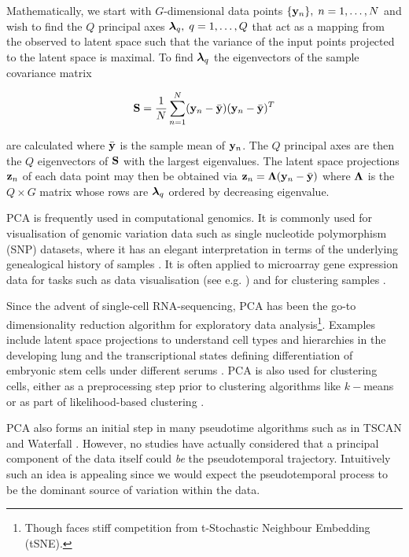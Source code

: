 Mathematically, we start with $G$-dimensional data points $\{\mathbf{y}_n\}, \; n = 1, \ldots, N$ and wish to find the $Q$ principal axes $\bm{\lambda}_q, \; q = 1, \ldots, Q$ that act as a mapping from the observed to latent space such that the variance of the input points projected to the latent space is maximal. To find $\bm{\lambda}_q$ the eigenvectors of the sample covariance matrix

\begin{equation}
  \mathbf{S} = \frac{1}{N}\sum_{n = 1}^N (\mathbf{y}_n - \bar{\mathbf{y}}) (\mathbf{y}_n - \bar{\mathbf{y}})^T
\end{equation}

are calculated where $\bar{\mathbf{y}}$ is the sample mean of $\mathbf{y}_n$. The $Q$ principal axes are then the $Q$ eigenvectors of $\mathbf{S}$ with the largest eigenvalues. The latent space projections $\mathbf{z}_n$ of each data point may then be obtained via $\mathbf{z}_n = \bm{\Lambda} (\mathbf{y}_n - \bar{\mathbf{y}})$ where $\bm{\Lambda}$ is the $Q \times G$ matrix whose rows are $\bm{\lambda}_q$ ordered by decreasing eigenvalue.

PCA is frequently used in computational genomics. It is commonly used for visualisation of genomic variation data such as single nucleotide polymorphism (SNP) datasets, where it has an elegant interpretation in terms of the underlying genealogical history of samples \cite{mcvean2009genealogical}.
It is often applied to microarray gene expression data for tasks such as data visualisation (see e.g. \cite{ringner2008principal}) and for clustering samples \cite{yeung2001principal}.

Since the advent of single-cell RNA-sequencing, PCA has been the go-to dimensionality reduction algorithm for exploratory data analysis\footnote{Though faces stiff competition from t-Stochastic Neighbour Embedding (tSNE).}. Examples include latent space projections to understand cell types and hierarchies in the developing lung \cite{Treutlein2014-ob} and the transcriptional states defining differentiation of embryonic stem cells under different serums \cite{kolodziejczyk2015single}. PCA is also used for clustering cells, either as a preprocessing step prior to clustering algorithms like $k-$means or as part of likelihood-based clustering \cite{yau2016pcareduce}.

PCA also forms an initial step in many pseudotime algorithms such as in TSCAN \cite{Ji2016-gx} and Waterfall \cite{Shin2015}. However, no studies have actually considered that a principal component of the data itself could \emph{be} the pseudotemporal trajectory. Intuitively such an idea is appealing since we would expect the pseudotemporal process to be the dominant source of variation within the data.

